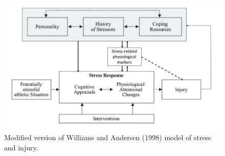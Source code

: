 \documentclass[man,floatsintext]{apa6}
\begin{document}
\begin{figure}

{\centering \includegraphics[width=1\linewidth]{figs/wa_new3} 

}

\caption{Modified version of Williams and Andersen (1998) model of stress and injury.}\label{fig:wanew}
\end{figure}
\end{document}
